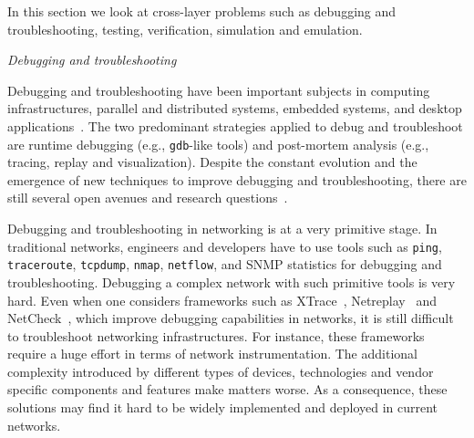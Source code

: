 In this section we look at cross-layer problems such as debugging and troubleshooting, testing, verification, simulation and emulation.

\vspace{2mm}
\noindent \textit{Debugging and troubleshooting}

Debugging and troubleshooting have been important subjects in computing infrastructures, 
parallel and distributed systems, embedded systems, and desktop 
applications~\cite{sigelman2010,layman2013,erlingsson2012,tomaselli2013,tan2010,fonseca2007,trivedi2014}. 
The two predominant strategies applied to debug and troubleshoot are runtime debugging 
(e.g., \texttt{gdb}-like tools) and post-mortem analysis (e.g., tracing, replay and visualization).
Despite the constant evolution and the emergence of new techniques to improve debugging and troubleshooting, 
there are still several open avenues and research questions~\cite{layman2013}.


Debugging and troubleshooting in networking is at a very primitive stage.
In traditional networks, engineers and developers have 
to use tools such as \texttt{ping}, \texttt{traceroute}, \texttt{tcpdump}, \texttt{nmap}, 
\texttt{netflow}, and SNMP statistics for debugging and troubleshooting.
Debugging a complex 
network with such primitive tools is very hard.
Even when one considers frameworks such as
XTrace~\cite{fonseca2007}, Netreplay~\cite{anand2010} 
and NetCheck~\cite{zhuang2014}, which improve debugging capabilities in networks, it is still difficult 
to troubleshoot networking infrastructures. For instance, these frameworks require a huge effort in terms of 
network instrumentation. The additional complexity introduced 
by different types of devices, technologies and vendor specific components and features make matters worse.
As a consequence, 
these solutions may find it hard to be widely implemented and deployed in current networks.

